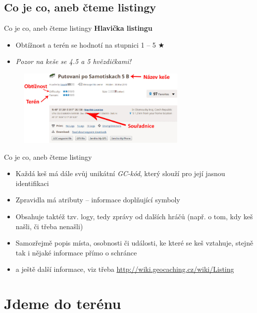 \documentclass{beamer}
\begin{document}
	\subsection{Co je co, aneb čteme listingy}
	\begin{frame}{Co je co, aneb čteme listingy}
		\textbf{Hlavička listingu}
		\begin{itemize}
			\item Obtížnost a terén se hodnotí na stupnici 1 -- 5 $\bigstar$
			\item \emph{Pozor na keše se 4.5 a 5 hvězdičkami!}
		\end{itemize}
		\begin{figure}[hb]
			\includegraphics[height=10em]{obr/hlavicka_kese.jpg}
		\end{figure}
	\end{frame}
	
	\begin{frame}{Co je co, aneb čteme listingy}
		\begin{itemize}
			\item Každá keš má dále svůj unikátní \emph{GC-kód}, který slouží pro její jasnou identifikaci
			\item Zpravidla má atributy -- informace doplňující symboly
			\item Obsahuje taktéž tzv. logy, tedy zprávy od dalších hráčů (např. o tom, kdy keš našli, či třeba nenašli)
			\item Samozřejmě popis místa, osobnosti či události, ke které se keš vztahuje, stejně tak i nějaké informace přímo o schránce
			\item a ještě další informace, viz třeba \url{http://wiki.geocaching.cz/wiki/Listing}
		\end{itemize}

	\end{frame}	
	
	\section{Jdeme do terénu}
\end{document}
